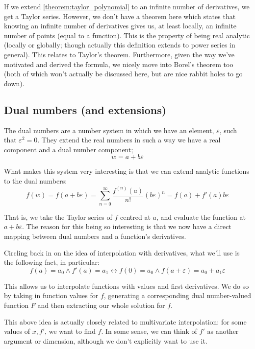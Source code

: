 If we extend \ref{theorem:taylor_polynomial} to an infinite number of derivatives, we get a Taylor series. However, we don't have a theorem here which states that knowing an infinite number of derivatives gives us, at least locally, an infinite number of points (equal to a function). This is the property of being real analytic (locally or globally; though actually this definition extends to power series in general). This relates to Taylor's theorem. Furthermore, given the way we've motivated and derived the formula, we nicely move into Borel's theorem too (both of which won't actually be discussed here, but are nice rabbit holes to go down).


\subsection{Dual numbers (and extensions)}
The dual numbers are a number system in which we have an element, $\varepsilon$, such that $\varepsilon^2=0$. They extend the real numbers in such a way we have a real component and a dual number component;
$$
w=a+b\varepsilon
$$

What makes this system very interesting is that we can extend analytic functions to the dual numbers:
$$
f(w)=f(a+b\varepsilon)=\sum_{n=0}^{\infty}{\frac{f^{(n)}(a)}{n!}(b\varepsilon)^n}=f(a)+f'(a)b\varepsilon
$$

That is, we take the Taylor series of $f$ centred at $a$, and evaluate the function at $a+b\varepsilon$. The reason for this being so interesting is that we now have a direct mapping between dual numbers and a function's derivatives.

Circling back in on the idea of interpolation with derivatives, what we'll use is the following fact, in particular:
$$
    f(a)=a_0\land f'(a)=a_1\leftrightarrow f(0)=a_0\land f(a+\varepsilon)=a_0+a_1\varepsilon
$$

This allows us to interpolate functions with values and first derivatives. We do so by taking in function values for $f$, generating a corresponding dual number-valued function $F$ and then extracting our whole solution for $f$.

This above idea is actually closely related to multivariate interpolation: for some values of $x, f'$, we want to find $f$. In some sense, we can think of $f'$ as another argument or dimension, although we don't explicitly want to use it.

